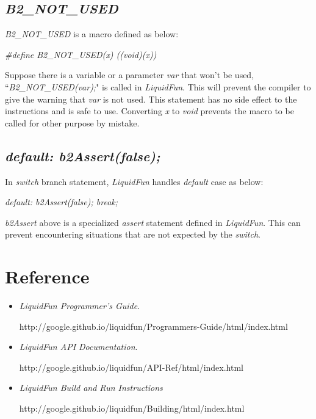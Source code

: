 \documentclass[UTF8]{ctexart}
\begin{document}
        \subsection{\textit{B2\_NOT\_USED}}

            \textit{B2\_NOT\_USED} is a macro defined as below:

            \textit{\#define B2\_NOT\_USED(x) ((void)(x))}

            Suppose there is a variable or a parameter \textit{var} that won't be used, ``\textit{B2\_NOT\_USED(var);}" is called in \textit{LiquidFun}. This will prevent the compiler to give the warning that \textit{var} is not used. This statement has no side effect to the instructions and is safe to use. Converting \textit{x} to \textit{void} prevents the macro to be called for other purpose by mistake.

        \subsection{\textit{default: b2Assert(false);}}

            In \textit{switch} branch statement, \textit{LiquidFun} handles \textit{default} case as below:

            \textit{default: b2Assert(false); break;}

            \textit{b2Assert} above is a specialized \textit{assert} statement defined in \textit{LiquidFun}. This can prevent encountering situations that are not expected by the \textit{switch}.

    \section{Reference}

        \begin{itemize}
            \item \textit{LiquidFun Programmer's Guide}.

                  http://google.github.io/liquidfun/Programmers-Guide/html/index.html
                  
            \item \textit{LiquidFun API Documentation}.

                  http://google.github.io/liquidfun/API-Ref/html/index.html

            \item \textit{LiquidFun Build and Run Instructions}

                http://google.github.io/liquidfun/Building/html/index.html

        \end{itemize}
\end{document}

